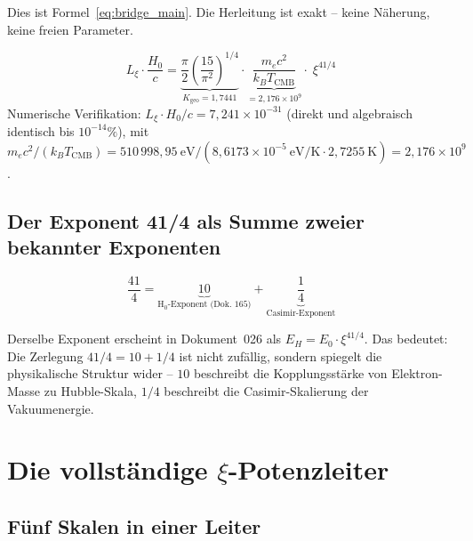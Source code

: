 Dies ist Formel~\eqref{eq:bridge_main}. Die Herleitung ist exakt -- keine Näherung,
keine freien Parameter.

\begin{keyresult}
    \begin{equation}
        L_\xi \cdot \frac{H_0}{c}
        = \underbrace{\frac{\pi}{2}\left(\frac{15}{\pi^2}\right)^{1/4}}_{K_\text{geo} = 1{,}7441}
        \cdot
        \underbrace{\frac{m_e c^2}{k_B T_\text{CMB}}}_{= 2{,}176 \times 10^9}
        \cdot\; \xi^{41/4}
        \label{eq:bridge_boxed}
    \end{equation}
    Numerische Verifikation: $L_\xi \cdot H_0/c = 7{,}241 \times 10^{-31}$
    (direkt und algebraisch identisch bis $10^{-14}\%$), mit
    $m_ec^2/(k_BT_\text{CMB}) = 510\,998{,}95~\text{eV}/(8{,}6173\times10^{-5}~\text{eV/K}\cdot 2{,}7255~\text{K}) = 2{,}176\times10^9$.
\end{keyresult}

\subsection{Der Exponent 41/4 als Summe zweier bekannter Exponenten}

\begin{equation}
    \frac{41}{4} = \underbrace{10}_{\text{H}_0\text{-Exponent (Dok.~165)}}
                 + \underbrace{\frac{1}{4}}_{\text{Casimir-Exponent}}
    \label{eq:exponent_decomp}
\end{equation}

Derselbe Exponent erscheint in Dokument~026 als $E_H = E_0 \cdot \xi^{41/4}$.
Das bedeutet: Die Zerlegung $41/4 = 10 + 1/4$ ist nicht zufällig, sondern
spiegelt die physikalische Struktur wider -- $10$ beschreibt die
Kopplungsstärke von Elektron-Masse zu Hubble-Skala, $1/4$ beschreibt
die Casimir-Skalierung der Vakuumenergie.

\section{Die vollständige \texorpdfstring{$\xi$}{xi}-Potenzleiter}
\label{sec:leiter}

\subsection{Fünf Skalen in einer Leiter}

